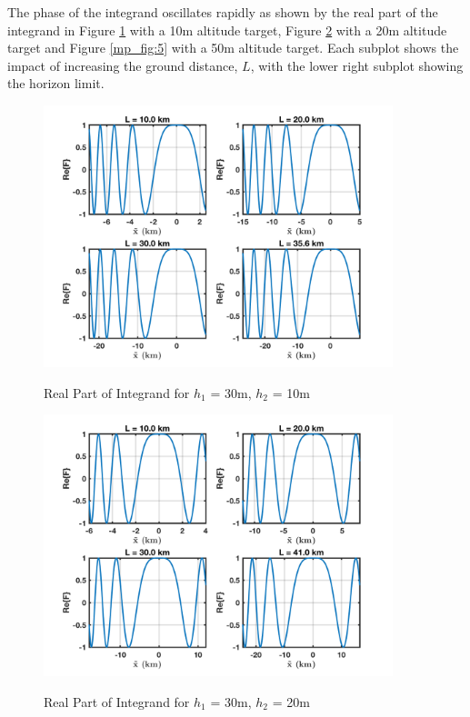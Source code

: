 The phase of the integrand oscillates rapidly as shown by the real part of the integrand in Figure \ref{mp_fig:3} with a 10m altitude target, Figure \ref{mp_fig:4} with a 20m altitude target and Figure \ref{mp_fig:5} with a 50m altitude target. Each subplot shows the impact of increasing the ground distance, $L$, with the lower right subplot showing the horizon limit.

\begin{figure}[H]
  \begin{center}
\includegraphics[width=4in]{../media/analysis/phaseVariation_30_10}
  \end{center}
  \renewcommand{\baselinestretch}{1} \small\normalsize
  \begin{quote}
    \caption[Real Part of Integrand for $h_1$ = 30m, $h_2$ = 10m]{ Real Part of Integrand for $h_1$ = 30m, $h_2$ = 10m\label{mp_fig:3}}
  \end{quote}
\end{figure}
\renewcommand{\baselinestretch}{2} \small\normalsize

\begin{figure}[H]
  \begin{center}
\includegraphics[width=4in]{../media/analysis/phaseVariation_30_20}
  \end{center}
  \renewcommand{\baselinestretch}{1} \small\normalsize
  \begin{quote}
  \caption[Real Part of Integrand for $h_1$ = 30m, $h_2$ = 20m]{ Real Part of Integrand for $h_1$ = 30m, $h_2$ = 20m\label{mp_fig:4}}
  \end{quote}
\end{figure}
\renewcommand{\baselinestretch}{2} \small\normalsize

